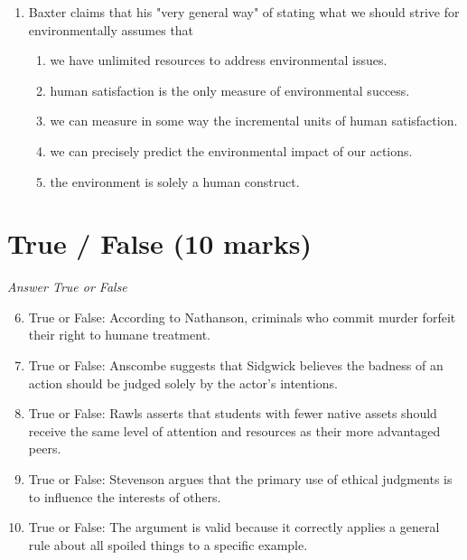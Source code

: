 \documentclass[12pt]{article}
\begin{document}
\begin{enumerate}[label=\arabic*.]
\begin{enumerate}[label=(\alph*)]
    \item Thomas Aquinas
    \item Catherine of Siena
    \item Teresa of Avila
    \item Hildegard of Bingen
    \item John of the Cross
\end{enumerate}
\item Baxter claims that his "very general way" of stating what we should strive for environmentally assumes that
\begin{enumerate}[label=(\alph*)]
    \item we have unlimited resources to address environmental issues.
    \item human satisfaction is the only measure of environmental success.
    \item we can measure in some way the incremental units of human satisfaction.
    \item we can precisely predict the environmental impact of our actions.
    \item the environment is solely a human construct.
\end{enumerate}
\end{enumerate}

\section*{True / False (10 marks)}
\textit{Answer True or False}
\begin{enumerate}[label=\arabic*.]
\setcounter{enumi}{5}
\item True or False: According to Nathanson, criminals who commit murder forfeit their right to humane treatment.
\item True or False: Anscombe suggests that Sidgwick believes the badness of an action should be judged solely by the actor's intentions.
\item True or False: Rawls asserts that students with fewer native assets should receive the same level of attention and resources as their more advantaged peers.
\item True or False: Stevenson argues that the primary use of ethical judgments is to influence the interests of others.
\item True or False: The argument is valid because it correctly applies a general rule about all spoiled things to a specific example.
\end{enumerate}
\end{document}
